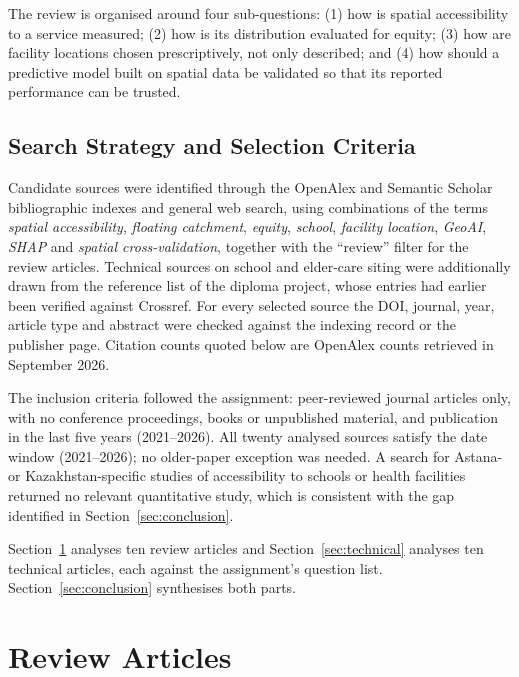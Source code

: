 \documentclass[pdflatex,sn-mathphys-num]{sn-jnl}
\begin{document}
The review is organised around four sub-questions: (1) how is spatial accessibility to a service measured; (2) how is its distribution evaluated for equity; (3) how are facility locations chosen prescriptively, not only described; and (4) how should a predictive model built on spatial data be validated so that its reported performance can be trusted.

\subsection{Search Strategy and Selection Criteria}
Candidate sources were identified through the OpenAlex and Semantic Scholar bibliographic indexes and general web search, using combinations of the terms \emph{spatial accessibility}, \emph{floating catchment}, \emph{equity}, \emph{school}, \emph{facility location}, \emph{GeoAI}, \emph{SHAP} and \emph{spatial cross-validation}, together with the ``review'' filter for the review articles. Technical sources on school and elder-care siting were additionally drawn from the reference list of the diploma project, whose entries had earlier been verified against Crossref. For every selected source the DOI, journal, year, article type and abstract were checked against the indexing record or the publisher page. Citation counts quoted below are OpenAlex counts retrieved in September 2026.

The inclusion criteria followed the assignment: peer-reviewed journal articles only, with no conference proceedings, books or unpublished material, and publication in the last five years (2021--2026). All twenty analysed sources satisfy the date window (2021--2026); no older-paper exception was needed. A search for Astana- or Kazakhstan-specific studies of accessibility to schools or health facilities returned no relevant quantitative study, which is consistent with the gap identified in Section~\ref{sec:conclusion}.

Section~\ref{sec:reviews} analyses ten review articles and Section~\ref{sec:technical} analyses ten technical articles, each against the assignment's question list. Section~\ref{sec:conclusion} synthesises both parts.

\section{Review Articles}
\label{sec:reviews}
\end{document}
